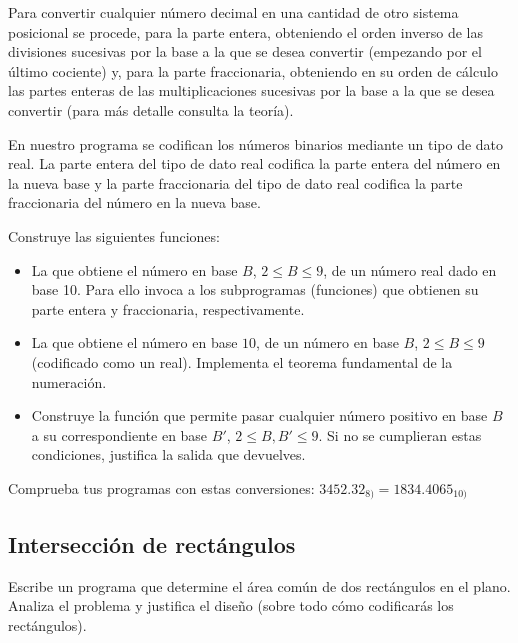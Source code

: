 Para convertir cualquier número decimal en una cantidad de otro sistema posicional se procede, para la parte entera, obteniendo el orden inverso de las divisiones sucesivas por la base a la que se desea convertir (empezando por el último cociente) y, para la parte fraccionaria, obteniendo en su orden de cálculo las partes enteras de las multiplicaciones sucesivas por la base a la que se desea convertir (para más detalle consulta la teoría).

En nuestro programa  se codifican los números binarios mediante un tipo de dato real. La parte entera del tipo de dato real codifica la parte entera del número en la nueva base y la parte fraccionaria del tipo de dato real codifica la parte fraccionaria del número en la nueva base.

Construye las siguientes funciones:
\begin{itemize}
\item La que obtiene el número en base $B$, $2\leq B\leq 9$, de un número real dado en base 10. Para ello invoca a los subprogramas (funciones) que obtienen su parte entera y fraccionaria, respectivamente.

\item La que obtiene el número en base $10$, de un número en base $B$, $2\leq B\leq 9$ (codificado como un real). Implementa el teorema fundamental de la numeración.

\item Construye la función que permite pasar cualquier número positivo en base $B$ a su correspondiente en base $B'$, $2\leq B, B'\leq 9$.
Si no se cumplieran estas condiciones, justifica la salida que devuelves.
\end{itemize}


Comprueba tus programas con estas conversiones: $3452.32_{8)} = 1834.4065_{10)}$







\separacion
\subsection{Intersección de rectángulos}


Escribe un programa que determine el área común de dos rectángulos en el plano. Analiza el problema y justifica el diseño (sobre todo cómo codificarás los rectángulos).

